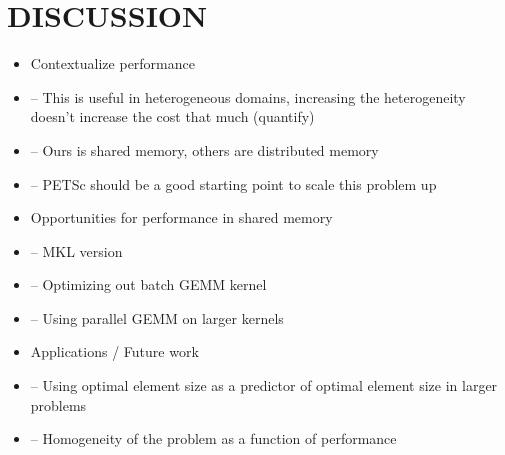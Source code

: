 \section{DISCUSSION}
\begin{itemize}
	\item Contextualize performance 
	\item -- This is useful in heterogeneous domains, increasing the heterogeneity doesn't increase the cost that much (quantify)
	\item -- Ours is shared memory, others are distributed memory 
	\item -- PETSc should be a good starting point to scale this problem up 
	\item Opportunities for performance in shared memory
	\item -- MKL version 
	\item -- Optimizing out batch GEMM kernel 
	\item -- Using parallel GEMM on larger kernels 
	\item Applications / Future work 
	\item -- Using optimal element size as a predictor of optimal element size in larger problems 
	\item -- Homogeneity of the problem as a function of performance 
\end{itemize}


